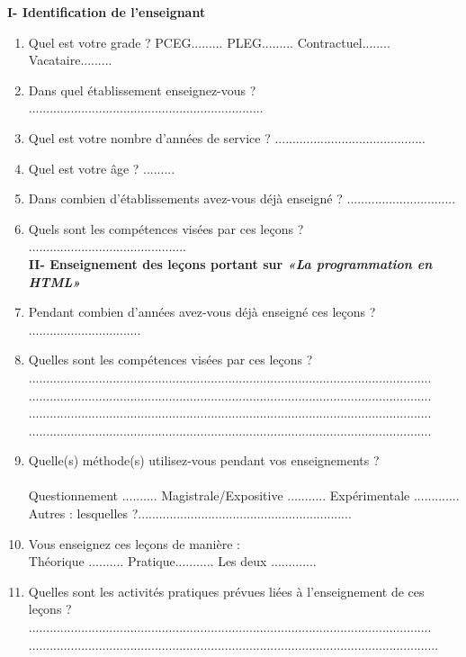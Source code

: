 \textbf{I- Identification de l'enseignant}
\begin{enumerate}
  \item Quel est votre grade ?  PCEG.........	PLEG......... Contractuel........  Vacataire.........
  \item Dans quel établissement enseignez-vous ? ...................................................................
  \item Quel est votre nombre d'années de service ? ...........................................
  \item Quel est votre âge ? .........
  \item Dans combien d’établissements avez-vous déjà enseigné ? ...............................
  \item Quels sont les compétences visées par ces leçons ? .............................................
	\\
	
	\textbf{II- Enseignement des leçons portant sur \emph{«La programmation en HTML»}}\\
	
  \item Pendant combien d'années avez-vous déjà enseigné ces leçons ? ................................
  \item Quelles sont les compétences visées par ces leçons ?\\ ................................................................................................................... \\................................................................................................................... \\
................................................................................................................... \\................................................................................................................... \\
  \item Quelle(s) méthode(s) utilisez-vous pendant vos enseignements ?\\\\
Questionnement ..........  Magistrale/Expositive ........... Expérimentale .............\\
Autres : lesquelles ?.............................................................
  \item Vous enseignez ces leçons de manière :\\
	Théorique ..........  Pratique...........  Les deux .............
  \item Quelles sont les activités pratiques prévues liées à l'enseignement de ces leçons ?\\ ................................................................................................................... \\.....................................................................................................................\\


\end{enumerate}
